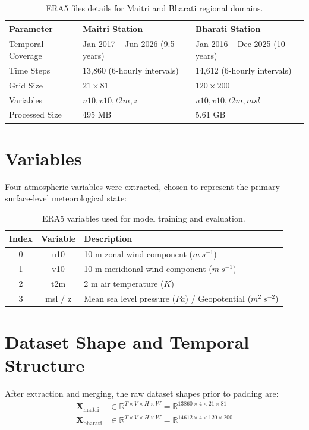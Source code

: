 \documentclass[12pt,titlepage,a4paper]{report}
\begin{document}
\begin{table}[H]
\centering
\begin{tabular}{lll}
    \toprule
    \textbf{Parameter} & \textbf{Maitri Station} & \textbf{Bharati Station} \\
    \midrule
    Temporal Coverage & Jan 2017 -- Jun 2026 (9.5 years) & Jan 2016 -- Dec 2025 (10 years) \\
    Time Steps & 13,860 (6-hourly intervals) & 14,612 (6-hourly intervals) \\
    Grid Size & $21 \times 81$ & $120 \times 200$ \\
    Variables & $u10, v10, t2m, z$ & $u10, v10, t2m, msl$ \\
    Processed Size & 495 MB & 5.61 GB \\
    \bottomrule
\end{tabular}
\caption{ERA5 files details for Maitri and Bharati regional domains.}
\label{tab:era_datasets}
\end{table}

\section{Variables}
Four atmospheric variables were extracted, chosen to represent the primary surface-level meteorological state:
\begin{table}[H]
\centering
\begin{tabular}{ccl}
    \toprule
    \textbf{Index} & \textbf{Variable} & \textbf{Description} \\
    \midrule
    0 & u10 & 10 m zonal wind component ($m\ s^{-1}$) \\
    1 & v10 & 10 m meridional wind component ($m\ s^{-1}$) \\
    2 & t2m & 2 m air temperature ($K$) \\
    3 & msl / z & Mean sea level pressure ($Pa$) / Geopotential ($m^2\ s^{-2}$) \\
    \bottomrule
\end{tabular}
\caption{ERA5 variables used for model training and evaluation.}
\label{tab:variables}
\end{table}

\section{Dataset Shape and Temporal Structure}
After extraction and merging, the raw dataset shapes prior to padding are:
\begin{align}
    \mathbf{X}_{\text{maitri}} &\in \mathbb{R}^{T \times V \times H \times W} = \mathbb{R}^{13860 \times 4 \times 21 \times 81} \\
    \mathbf{X}_{\text{bharati}} &\in \mathbb{R}^{T \times V \times H \times W} = \mathbb{R}^{14612 \times 4 \times 120 \times 200}
\end{align}
\end{document}

